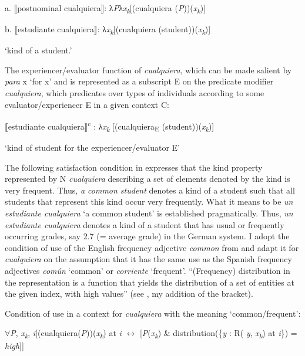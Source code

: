   a.  ⟦postnominal cualquiera⟧: λ\textit{P}λ\textit{x\textsubscript{k}}[(cualquiera (\textit{P}))(\textit{x\textsubscript{k}})]

  b.  ⟦estudiante cualquiera⟧: λ\textit{x\textsubscript{k}}[(cualquiera (student))(\textit{x\textsubscript{k}})]

    ‘kind of a student.’

The experiencer/evaluator function of \textit{cualquiera}, which can be made salient by \textit{para} x ‘for x’ and is represented as a subscript E on the predicate modifier \textit{cualquiera}, which predicates over types of individuals according to some evaluator/experiencer E in a given context C:

  ⟦estudiante cualquiera⟧\textsuperscript{c} : λ\textit{x\textsubscript{k} }[(cualquiera\textsubscript{E} (student))(\textit{x\textsubscript{k}})] 

  ‘kind of student for the experiencer/evaluator E’

The following satisfaction condition in  expresses that the kind property represented by N \textit{cualquiera} describing a set of elements denoted by the kind is very frequent. Thus, \textit{a common student} denotes a kind of a student such that all students that represent this kind occur very frequently. What it means to be \textit{un estudiante cualquiera} ‘a common student’ is established pragmatically. Thus, \textit{un estudiante cualquiera} denotes a kind of a student that has usual or frequently occurring grades, say 2.7 (= average grade) in the German system. I adopt the condition of use of the English frequency adjective \textit{common} from \citet{GehrkeMcNally2015} and adapt it for \textit{cualquiera} on the assumption that it has the same use as the Spanish frequency adjectives \textit{común} ‘common’ or \textit{corriente} ‘frequent’. “(Frequency) distribution in the representation is a function that yields the distribution of a set of entities at the given index, with high values” (see \citealt{GehrkeMcNally2015}, my addition of the bracket).

\label{bkm:Ref54641377}    Condition of use in a context for \textit{cualquiera} with the meaning ‘common/frequent’:

    ${\forall}$\textit{P}, \textit{x\textsubscript{k}}, \textit{i}[(cualquiera(\textit{P}))(\textit{x\textsubscript{k}}) at \textit{i} $\leftrightarrow $ [\textit{P}(\textit{x\textsubscript{k}}) \& distribution(\{\textit{y} : R( \textit{y}, \textit{x\textsubscript{k}}) at \textit{i}\}) = \textit{high}]]

